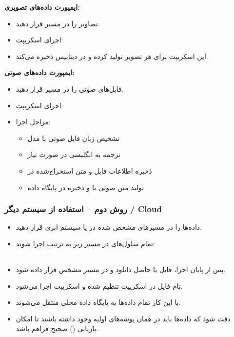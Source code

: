 \documentclass{article}
\begin{document}
\textbf{ایمپورت داده‌های تصویری:}
\begin{itemize}
\item تصاویر را در مسیر  قرار دهید.

\item اجرای اسکریپت: 
\item این اسکریپت برای هر تصویر  تولید کرده و در دیتابیس ذخیره می‌کند.

\end{itemize}

\textbf{ایمپورت داده‌های صوتی:}
\begin{itemize}
\item فایل‌های صوتی را در مسیر  قرار دهید.

\item اجرای اسکریپت: 
\item مراحل اجرا:
\begin{itemize}
\item تشخیص زبان فایل صوتی با مدل 
\item ترجمه به انگلیسی در صورت نیاز
\item ذخیره اطلاعات فایل و متن استخراج‌شده در 
\item تولید  متن صوتی با  و ذخیره در پایگاه داده
\end{itemize}
\end{itemize}

\subsubsection{روش دوم – استفاده از سیستم دیگر / Cloud}

\begin{itemize}
\item داده‌ها را در مسیرهای مشخص شده در  یا سیستم ابری قرار دهید.

\item تمام سلول‌های  در مسیر زیر به ترتیب اجرا شوند: \\
 \\
\item پس از پایان اجرا، فایل  یا  حاصل دانلود و در مسیر مشخص قرار داده شود.

\item نام فایل در اسکریپت  تنظیم شده و اسکریپت اجرا می‌شود.

\item با این کار تمام داده‌ها به پایگاه داده محلی منتقل می‌شوند.

\item دقت شود که داده‌ها باید در همان پوشه‌های اولیه وجود داشته باشند تا امکان بازیابی () صحیح فراهم باشد.

\end{itemize}
\end{document}
